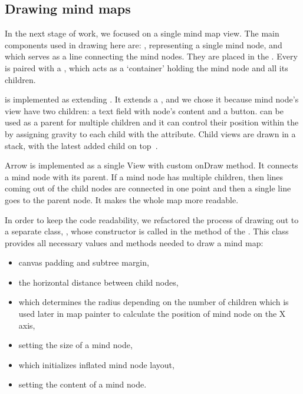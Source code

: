 \subsection{Drawing mind maps}
\label{subsec:drawing}
In the next stage of work, we focused on a single mind map view. The main components used in drawing here are: , representing a single mind node, and  which serves as a line connecting the mind nodes. They are placed in the . Every  is paired with a , which acts as a `container' holding the mind node and all its children.

 is implemented as extending . It extends a , and we chose it because mind node's view have two children: a text field with node's content and a button.  can be used as a parent for multiple children and it can control their position within the  by assigning gravity to each child with the  attribute. Child views are drawn in a stack, with the latest added child on top~\cite{API:2013:fl}.

Arrow is implemented as a single View with custom onDraw method. It connects a mind node with its parent. If a mind node has multiple children, then lines coming out of the child nodes are connected in one point and then a single line goes to the parent node. It makes the whole map more readable.

In order to keep the code readability, we refactored the process of drawing out to a separate class, , whose constructor is called in the  method of the . This class provides all necessary values and methods needed to draw a mind map:

\begin{itemize}
	\item canvas padding and subtree margin,
	\item the horizontal distance between child nodes,
	\item {} which determines the radius depending on the number of children which is used later in map painter to calculate the position of mind node on the X axis,
	\item {} setting the size of a mind node,
	\item {} which initializes inflated mind node layout,
	\item {} setting the content of a mind node.
\end{itemize}

